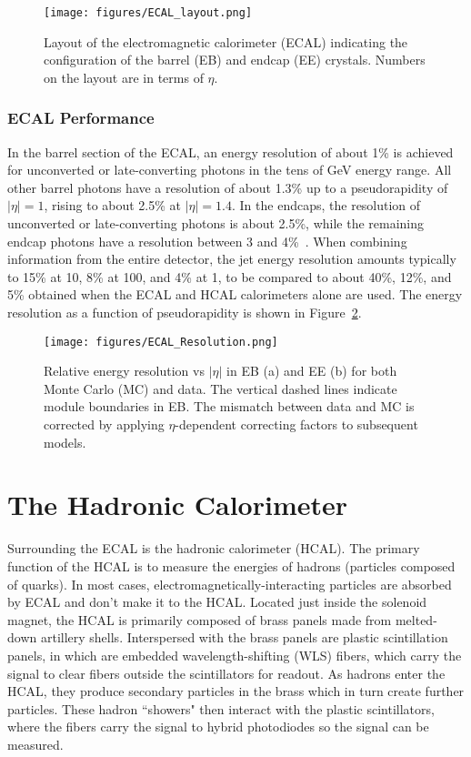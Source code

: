 \begin{figure}\centering
  \texttt{[image: figures/ECAL\_layout.png]}
  \caption{\label{fig:ECAL_layout} Layout of the electromagnetic calorimeter (ECAL) indicating the configuration of the barrel (EB) and endcap (EE) crystals. Numbers on the layout are in terms of $\eta$.}
\end{figure}

\subsubsection{ECAL Performance}

In the barrel section of the ECAL, an energy resolution of about 1\% is achieved for unconverted or late-converting photons in the tens of GeV energy range. All other barrel photons have a resolution of about 1.3\% up to a pseudorapidity of $|\eta| = 1$, rising to about 2.5\% at $|\eta| = 1.4$. In the endcaps, the resolution of unconverted or late-converting photons is about 2.5\%, while the remaining endcap photons have a resolution between 3 and 4\%~\cite{CMS:EGM-14-001}. When combining information from the entire detector, the jet energy resolution amounts typically to 15\% at 10\GeV, 8\% at 100\GeV, and 4\% at 1\TeV, to be compared to about 40\%, 12\%, and 5\% obtained when the ECAL and HCAL calorimeters alone are used. The energy resolution as a function of pseudorapidity is shown in Figure~\ref{fig:ECAL_Resolution}\cite{ECAL}.

\begin{figure}\centering
  \texttt{[image: figures/ECAL\_Resolution.png]}
  \caption{\label{fig:ECAL_Resolution} Relative energy resolution vs $|\eta|$ in EB (a) and EE (b) for both Monte Carlo (MC) and data. The vertical dashed lines indicate module boundaries in EB. The mismatch between data and MC is corrected by applying $\eta$-dependent correcting factors to subsequent models.}
\end{figure}





\section{The Hadronic Calorimeter}

Surrounding the ECAL is the hadronic calorimeter (HCAL). The primary function of the HCAL is to measure the energies of hadrons (particles composed of quarks). In most cases, electromagnetically-interacting particles are absorbed by ECAL and don't make it to the HCAL. Located just inside the solenoid magnet, the HCAL is primarily composed of brass panels made from melted-down artillery shells. Interspersed with the brass panels are plastic scintillation panels, in which are embedded wavelength-shifting (WLS) fibers, which carry the signal to clear fibers outside the scintillators for readout. As hadrons enter the HCAL, they produce secondary particles in the brass which in turn create further particles. These hadron ``showers" then interact with the plastic scintillators, where the fibers carry the signal to hybrid photodiodes so the signal can be measured.

